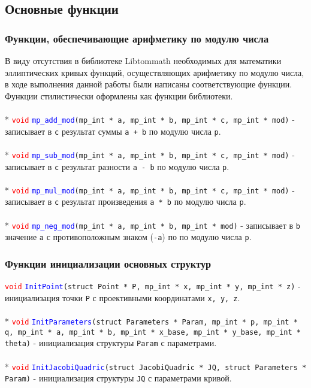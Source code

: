 \documentclass[12pt]{article}
\begin{document}
\subsection{Основные функции}
\subsubsection{Функции, обеспечивающие арифметику по модулю числа}
В виду отсутствия в библиотеке Libtommath необходимых для математики эллиптических кривых функций, осуществляющих арифметику по модулю числа, в ходе выполнения данной работы были написаны соответствующие функции. Функции стилистически оформлены как функции библиотеки.\\
\\*
\textcolor{red}{\texttt{void}} \textcolor{blue}{\texttt{mp\_add\_mod}}\texttt{(mp\_int * a, mp\_int * b, mp\_int * c, mp\_int * mod)} - записывает в \texttt{c} результат суммы \texttt{a + b} по модулю числа \texttt{p}.\\
\\*
\textcolor{red}{\texttt{void}} \textcolor{blue}{\texttt{mp\_sub\_mod}}\texttt{(mp\_int * a, mp\_int * b, mp\_int * c, mp\_int * mod)} - записывает в \texttt{c} результат разности \texttt{a - b} по модулю числа \texttt{p}.\\
\\*
\textcolor{red}{\texttt{void}} \textcolor{blue}{\texttt{mp\_mul\_mod}}\texttt{(mp\_int * a, mp\_int * b, mp\_int * c, mp\_int * mod)} - записывает в \texttt{c} результат произведения \texttt{a * b} по модулю числа \texttt{p}.\\
\\*
\textcolor{red}{\texttt{void}} \textcolor{blue}{\texttt{mp\_neg\_mod}}\texttt{(mp\_int * a, mp\_int * b, mp\_int * mod)} - записывает в \texttt{b} значение \texttt{a} с противоположным знаком (\texttt{-a}) по по модулю числа \texttt{p}.\\

\subsubsection{Функции инициализации основных структур}
\textcolor{red}{\texttt{void}} \textcolor{blue}{\texttt{InitPoint}}\texttt{(struct Point * P, mp\_int * x, mp\_int * y, mp\_int * z)} - инициализация точки \texttt{P} с проективными координатами \texttt{x, y, z}.\\
\\*
\textcolor{red}{\texttt{void}} \textcolor{blue}{\texttt{InitParameters}}\texttt{(struct Parameters * Param, mp\_int * p, mp\_int * q, mp\_int * a, mp\_int * b, mp\_int * x\_base, mp\_int * y\_base, mp\_int * theta)} - инициализация структуры \texttt{Param} с параметрами.\\
\\*
\textcolor{red}{\texttt{void}} \textcolor{blue}{\texttt{InitJacobiQuadric}}\texttt{(struct JacobiQuadric * JQ, struct Parameters * Param)} - инициализация структуры \texttt{JQ} с параметрами кривой.\\ 
\end{document}
